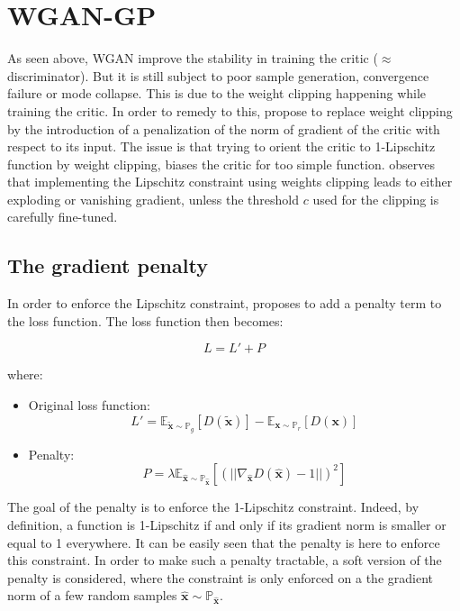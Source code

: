 \documentclass[11pt,a4paper,twoside]{report}
\begin{document}
\section{WGAN-GP}

As seen above, WGAN improve the stability in training the critic ($\approx$ discriminator). But it is still subject to poor sample generation, convergence failure or mode collapse. This is due to the weight clipping happening while training the critic. In order to remedy to this, \cite{DBLP:journals/corr/GulrajaniAADC17} propose to replace weight clipping by the introduction of a penalization of the norm of gradient of the critic with respect to its input. The issue is that trying to orient the critic to 1-Lipschitz function by weight clipping, biases the critic for too simple function. \cite{DBLP:journals/corr/GulrajaniAADC17} observes that implementing the Lipschitz constraint using weights clipping leads to either exploding or vanishing gradient, unless the threshold $c$ used for the clipping is carefully fine-tuned.

\subsection{The gradient penalty}

In order to enforce the Lipschitz constraint, \cite{DBLP:journals/corr/GulrajaniAADC17} proposes to add a penalty term to the loss function. The loss function then becomes: 

\begin{equation}
    L = L' + P
\end{equation}

where:

\begin{itemize}
    \item Original loss function: 
    \begin{equation}
        L' = \mathbb{E}_{\mathbf{\tilde{x}} \sim \mathbb{P}_g} [D(\mathbf{\tilde{x}})] - \mathbb{E}_{\mathbf{x} \sim \mathbb{P}_r} [D(\mathbf{x})]
    \end{equation}
    \item Penalty:
    \begin{equation}
        P = \lambda \mathbb{E}_{\hat{\mathbf{x}} \sim \mathbb{P}_{\hat{\mathbf{x}}}}[(||\nabla_{\hat{\mathbf{x}}} D(\hat{\mathbf{x}})-1||)^2]
    \end{equation}
\end{itemize}

The goal of the penalty is to enforce the 1-Lipschitz constraint. Indeed, by definition, a function is 1-Lipschitz if and only if its gradient norm is smaller or equal to 1 everywhere. It can be easily seen that the penalty is here to enforce this constraint. In order to make such a penalty tractable, a soft version of the penalty is considered, where the constraint is only enforced on a the gradient norm of a few random samples $\hat{\mathbf{x}} \sim \mathbb{P}_{\hat{\mathbf{x}}}$.
\end{document}
